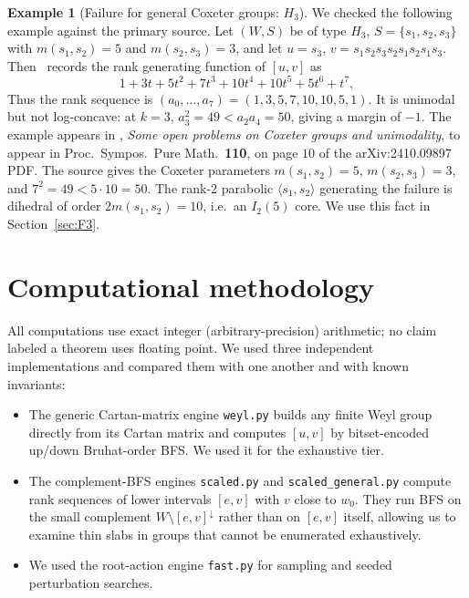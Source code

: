 \documentclass[11pt]{amsart}
\theoremstyle{plain}
\theoremstyle{definition}
\newtheorem{example}[theorem]{Example}
\theoremstyle{remark}
\newcommand{\W}{W}
\begin{document}
\begin{example}[Failure for general Coxeter groups: $H_3$]
\label{ex:H3}
We checked the following example against the primary source. Let $(W,S)$ be of type $H_3$, $S=\{s_1,s_2,s_3\}$ with
$m(s_1,s_2)=5$ and $m(s_2,s_3)=3$, and let $u=s_3$,
$v=s_1s_2s_3s_2s_1s_2s_1s_3$. Then~\cite[Conjecture~2.11]{brenti2024open}
records the rank generating function of $[u,v]$ as
\[
1+3t+5t^2+7t^3+10t^4+10t^5+5t^6+t^7,
\]
Thus the rank sequence is
$(a_0,\dots,a_7)=(1,3,5,7,10,10,5,1)$. It is unimodal but not
log-concave: at $k=3$, $a_3^2=49 < a_2a_4=50$, giving a margin of $-1$.
The example appears in \cite[Conjecture~2.11]{brenti2024open},
\emph{Some open problems on Coxeter groups and unimodality}, to appear in
Proc.\ Sympos.\ Pure Math.\ \textbf{110}, on page $10$ of the
arXiv:2410.09897 PDF. The source gives the Coxeter parameters
$m(s_1,s_2)=5,\,m(s_2,s_3)=3$, and $7^2=49<5\cdot10=50$. The rank-2
parabolic $\langle s_1,s_2\rangle$ generating the failure is dihedral of
order $2m(s_1,s_2)=10$, i.e.\ an $I_2(5)$ core. We use this fact in
Section~\ref{sec:F3}.
\end{example}

\section{Computational methodology}
\label{sec:methods}

All computations use exact integer (arbitrary-precision) arithmetic; no
claim labeled a theorem uses floating point. We used three independent
implementations and compared them with one another and with known
invariants:

\begin{itemize}
\item The generic Cartan-matrix engine \texttt{weyl.py} builds any finite
Weyl group directly from its Cartan matrix and computes $[u,v]$ by
bitset-encoded up/down Bruhat-order BFS. We used it for the exhaustive
tier.
\item The complement-BFS engines \texttt{scaled.py} and
\texttt{scaled\_general.py} compute rank sequences of lower intervals
$[e,v]$ with $v$ close to $w_0$. They run BFS on the small complement
$\W\setminus [e,v]^{\downarrow}$ rather than on $[e,v]$ itself, allowing us
to examine thin slabs in groups that cannot be enumerated exhaustively.
\item We used the root-action engine \texttt{fast.py} for sampling and
seeded perturbation searches.
\end{itemize}
\end{document}
